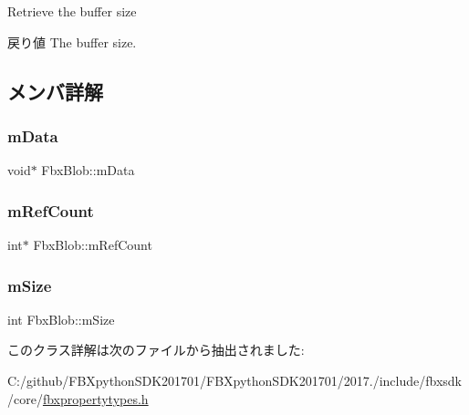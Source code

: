 Retrieve the buffer size \begin{DoxyReturn}{戻り値}
The buffer size. 
\end{DoxyReturn}


\subsection{メンバ詳解}
\mbox{\label{class_fbx_blob_af397c288f865eefa5e1fde8be443d9c2}} 
\subsubsection{\texorpdfstring{m\+Data}{mData}}
{\footnotesize\ttfamily void$\ast$ Fbx\+Blob\+::m\+Data\hspace{0.3cm}{\ttfamily [protected]}}

\mbox{\label{class_fbx_blob_ac25ef6a057beb9d5f1d072a77833b910}} 
\subsubsection{\texorpdfstring{m\+Ref\+Count}{mRefCount}}
{\footnotesize\ttfamily int$\ast$ Fbx\+Blob\+::m\+Ref\+Count\hspace{0.3cm}{\ttfamily [protected]}}

\mbox{\label{class_fbx_blob_a3c92f0ad0ff306800df7be4d94ac7528}} 
\subsubsection{\texorpdfstring{m\+Size}{mSize}}
{\footnotesize\ttfamily int Fbx\+Blob\+::m\+Size\hspace{0.3cm}{\ttfamily [protected]}}



このクラス詳解は次のファイルから抽出されました\+:\begin{DoxyCompactItemize}
\item 
C\+:/github/\+F\+B\+Xpython\+S\+D\+K201701/\+F\+B\+Xpython\+S\+D\+K201701/2017./include/fbxsdk/core/\hyperlink{fbxpropertytypes_8h}{fbxpropertytypes.\+h}\end{DoxyCompactItemize}
